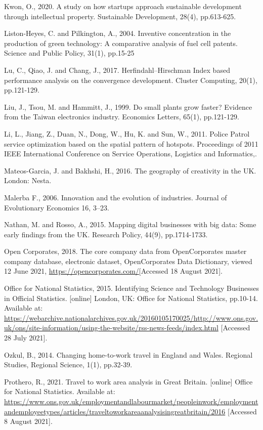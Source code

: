 \documentclass[
  12pt,
  oneside]{book}
\begin{document}
Kwon, O., 2020. A study on how startups approach sustainable development through intellectual property. Sustainable Development, 28(4), pp.613-625.

Liston-Heyes, C. and Pilkington, A., 2004. Inventive concentration in the production of green technology: A comparative analysis of fuel cell patents. Science and Public Policy, 31(1), pp.15-25

Lu, C., Qiao, J. and Chang, J., 2017. Herfindahl--Hirschman Index based performance analysis on the convergence development. Cluster Computing, 20(1), pp.121-129.

Liu, J., Tsou, M. and Hammitt, J., 1999. Do small plants grow faster? Evidence from the Taiwan electronics industry. Economics Letters, 65(1), pp.121-129.

Li, L., Jiang, Z., Duan, N., Dong, W., Hu, K. and Sun, W., 2011. Police Patrol service optimization based on the spatial pattern of hotspots. Proceedings of 2011 IEEE International Conference on Service Operations, Logistics and Informatics,.

Mateos-Garcia, J. and Bakhshi, H., 2016. The geography of creativity in the UK. London: Nesta.

Malerba F., 2006. Innovation and the evolution of industries. Journal of Evolutionary Economics 16, 3--23.

Nathan, M. and Rosso, A., 2015. Mapping digital businesses with big data: Some early findings from the UK. Research Policy, 44(9), pp.1714-1733.

Open Corporates, 2018. The core company data from OpenCorporates master company database, electronic dataset, OpenCorporates Data Dictionary, viewed 12 June 2021, \url{https://opencorporates.com/}{[}Accessed 18 August 2021{]}.

Office for National Statistics, 2015. Identifying Science and Technology Businesses in Official Statistics. {[}online{]} London, UK: Office for National Statistics, pp.10-14. Available at: \url{https://webarchive.nationalarchives.gov.uk/20160105170025/http://www.ons.gov.uk/ons/site-information/using-the-website/rss-news-feeds/index.html} {[}Accessed 28 July 2021{]}.

Ozkul, B., 2014. Changing home-to-work travel in England and Wales. Regional Studies, Regional Science, 1(1), pp.32-39.

Prothero, R., 2021. Travel to work area analysis in Great Britain. {[}online{]} Office for National Statistics. Available at: \url{https://www.ons.gov.uk/employmentandlabourmarket/peopleinwork/employmentandemployeetypes/articles/traveltoworkareaanalysisingreatbritain/2016} {[}Accessed 8 August 2021{]}.
\end{document}
